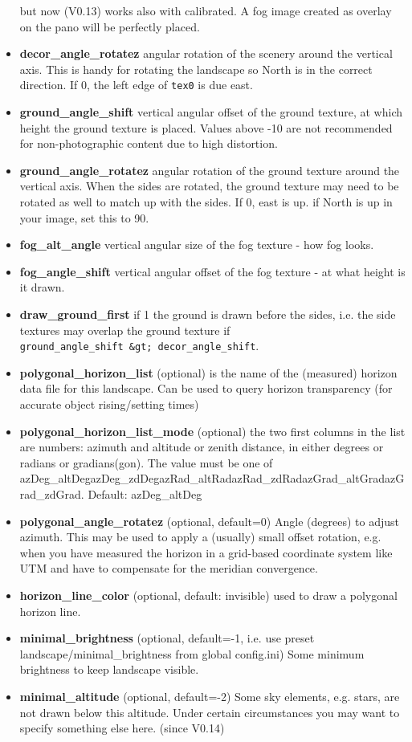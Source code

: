 \begin{itemize}
  but now (V0.13) works also with calibrated. A fog image created as
  overlay on the pano will be perfectly placed.
\item
  \textbf{decor\_angle\_rotatez} angular rotation of the scenery around
  the vertical axis. This is handy for rotating the landscape so North
  is in the correct direction. If 0, the left edge of \texttt{tex0} is
  due east.
\item
  \textbf{ground\_angle\_shift} vertical angular offset of the ground
  texture, at which height the ground texture is placed. Values above
  -10 are not recommended for non-photographic content due to high
  distortion.
\item
  \textbf{ground\_angle\_rotatez} angular rotation of the ground texture
  around the vertical axis. When the sides are rotated, the ground
  texture may need to be rotated as well to match up with the sides. If
  0, east is up. if North is up in your image, set this to 90.
\item
  \textbf{fog\_alt\_angle} vertical angular size of the fog texture -
  how fog looks.
\item
  \textbf{fog\_angle\_shift} vertical angular offset of the fog texture
  - at what height is it drawn.
\item
  \textbf{draw\_ground\_first} if 1 the ground is drawn before the
  sides, i.e. the side textures may overlap the ground texture if
  \texttt{ground\_angle\_shift\ \&gt;\ decor\_angle\_shift}.
\item
  \textbf{polygonal\_horizon\_list} (optional) is the name of the
  (measured) horizon data file for this landscape. Can be used to query
  horizon transparency (for accurate object rising/setting times)
\item
  \textbf{polygonal\_horizon\_list\_mode} (optional) the two first
  columns in the list are numbers: azimuth and altitude or zenith
  distance, in either degrees or radians or gradians(gon). The value
  must be one of
  azDeg\_altDeg\textbar{}azDeg\_zdDeg\textbar{}azRad\_altRad\textbar{}azRad\_zdRad\textbar{}azGrad\_altGrad\textbar{}azGrad\_zdGrad.
  Default: azDeg\_altDeg
\item
  \textbf{polygonal\_angle\_rotatez} (optional, default=0) Angle
  (degrees) to adjust azimuth. This may be used to apply a (usually)
  small offset rotation, e.g. when you have measured the horizon in a
  grid-based coordinate system like UTM and have to compensate for the
  meridian convergence.
\item
  \textbf{horizon\_line\_color} (optional, default: invisible) used to
  draw a polygonal horizon line.
\item
  \textbf{minimal\_brightness} (optional, default=-1, i.e. use preset
  landscape/minimal\_brightness from global config.ini) Some minimum
  brightness to keep landscape visible.
\item
  \textbf{minimal\_altitude} (optional, default=-2) Some sky elements,
  e.g. stars, are not drawn below this altitude. Under certain
  circumstances you may want to specify something else here. (since
  V0.14)
\end{itemize}

